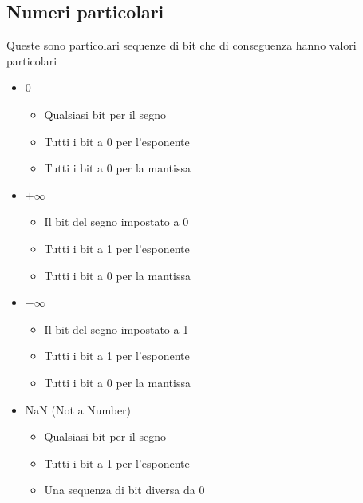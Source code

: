 \documentclass{article}
\begin{document}
           \subsection{Numeri particolari} 
           \begin{flushleft}
            Queste sono particolari sequenze di bit che di conseguenza hanno valori particolari
           \end{flushleft}
           \begin{itemize}
             \item 0
               \begin{itemize}
                 \item Qualsiasi bit per il segno
                 \item Tutti i bit a 0 per l'esponente
                 \item Tutti i bit a 0 per la mantissa
               \end{itemize}
             \item $+\infty$
               \begin{itemize}
                 \item Il bit del segno impostato a 0
                 \item Tutti i bit a 1 per l'esponente
                 \item Tutti i bit a 0 per la mantissa
               \end{itemize}
             \item $-\infty$
               \begin{itemize}
                 \item Il bit del segno impostato a 1
                 \item Tutti i bit a 1 per l'esponente
                 \item Tutti i bit a 0 per la mantissa
               \end{itemize}
             \item NaN (Not a Number)
               \begin{itemize}
                 \item Qualsiasi bit per il segno
                 \item Tutti i bit a 1 per l'esponente
                 \item Una sequenza di bit diversa da 0
               \end{itemize}
           \end{itemize}
\end{document}
